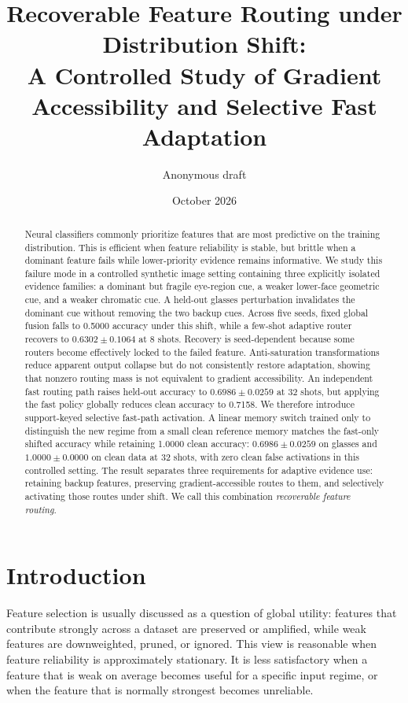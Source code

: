 \documentclass[10pt]{article}
\title{Recoverable Feature Routing under Distribution Shift:\\
A Controlled Study of Gradient Accessibility and Selective Fast Adaptation}
\author{Anonymous draft}
\date{October 2026}
\begin{document}
\maketitle

\begin{abstract}
Neural classifiers commonly prioritize features that are most predictive on the training distribution. This is efficient when feature reliability is stable, but brittle when a dominant feature fails while lower-priority evidence remains informative. We study this failure mode in a controlled synthetic image setting containing three explicitly isolated evidence families: a dominant but fragile eye-region cue, a weaker lower-face geometric cue, and a weaker chromatic cue. A held-out glasses perturbation invalidates the dominant cue without removing the two backup cues. Across five seeds, fixed global fusion falls to 0.5000 accuracy under this shift, while a few-shot adaptive router recovers to $0.6302 \pm 0.1064$ at 8 shots. Recovery is seed-dependent because some routers become effectively locked to the failed feature. Anti-saturation transformations reduce apparent output collapse but do not consistently restore adaptation, showing that nonzero routing mass is not equivalent to gradient accessibility. An independent fast routing path raises held-out accuracy to $0.6986 \pm 0.0259$ at 32 shots, but applying the fast policy globally reduces clean accuracy to 0.7158. We therefore introduce support-keyed selective fast-path activation. A linear memory switch trained only to distinguish the new regime from a small clean reference memory matches the fast-only shifted accuracy while retaining 1.0000 clean accuracy: $0.6986 \pm 0.0259$ on glasses and $1.0000 \pm 0.0000$ on clean data at 32 shots, with zero clean false activations in this controlled setting. The result separates three requirements for adaptive evidence use: retaining backup features, preserving gradient-accessible routes to them, and selectively activating those routes under shift. We call this combination \emph{recoverable feature routing}.
\end{abstract}

\section{Introduction}

Feature selection is usually discussed as a question of global utility: features that contribute strongly across a dataset are preserved or amplified, while weak features are downweighted, pruned, or ignored. This view is reasonable when feature reliability is approximately stationary. It is less satisfactory when a feature that is weak on average becomes useful for a specific input regime, or when the feature that is normally strongest becomes unreliable.
\end{document}
